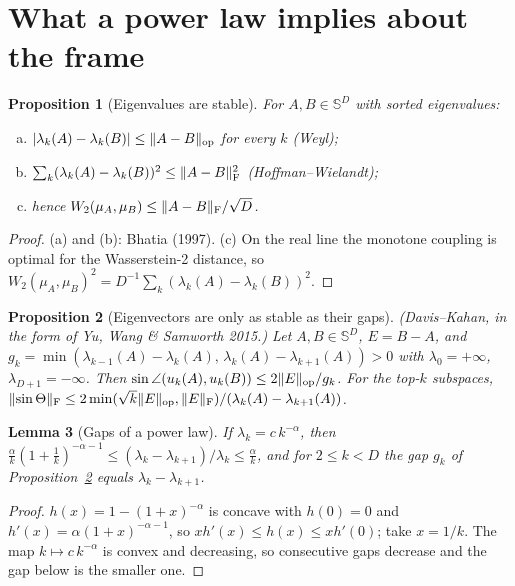 \documentclass[11pt,a4paper]{article}
\newcommand{\Sym}{\mathbb{S}}
\DeclarePairedDelimiter{\norm}{\lVert}{\rVert}
\DeclarePairedDelimiter{\abs}{\lvert}{\rvert}
\newcommand{\op}{\mathrm{op}}
\newcommand{\F}{\mathrm{F}}
\theoremstyle{plain}
\newtheorem{proposition}{Proposition}[section]
\newtheorem{lemma}[proposition]{Lemma}
\theoremstyle{definition}
\theoremstyle{remark}
\begin{document}
\section{What a power law implies about the frame}\label{sec:resolution}

\begin{proposition}[Eigenvalues are stable]\label{prop:weyl}
For $A,B\in\Sym^D$ with sorted eigenvalues:
\begin{enumerate}[(a)]
\item $\abs{\lambda_k(A)-\lambda_k(B)}\le\norm{A-B}_\op$ for every $k$ (Weyl);
\item $\sum_k(\lambda_k(A)-\lambda_k(B))^2\le\norm{A-B}_\F^2$ (Hoffman--Wielandt);
\item hence $W_2(\mu_A,\mu_B)\le\norm{A-B}_\F/\sqrt D$.
\end{enumerate}
\end{proposition}
\begin{proof}
(a) and (b): Bhatia (1997). (c) On the real line the monotone coupling is optimal for the Wasserstein-2 distance, so
$W_2(\mu_A,\mu_B)^2=D^{-1}\sum_k(\lambda_k(A)-\lambda_k(B))^2$.
\end{proof}

\begin{proposition}[Eigenvectors are only as stable as their gaps]\label{prop:dk}
(Davis--Kahan, in the form of Yu, Wang \& Samworth 2015.) Let $A,B\in\Sym^D$, $E=B-A$, and
$g_k=\min(\lambda_{k-1}(A)-\lambda_k(A),\,\lambda_k(A)-\lambda_{k+1}(A))>0$ with $\lambda_0=+\infty$,
$\lambda_{D+1}=-\infty$. Then $\sin\angle(u_k(A),u_k(B))\le2\norm{E}_\op/g_k$. For the top-$k$ subspaces,
$\norm{\sin\Theta}_\F\le2\min(\sqrt k\norm{E}_\op,\norm{E}_\F)/(\lambda_k(A)-\lambda_{k+1}(A))$.
\end{proposition}

\begin{lemma}[Gaps of a power law]\label{lem:gaps}
If $\lambda_k=c\,k^{-\alpha}$, then $\frac{\alpha}{k}(1+\frac1k)^{-\alpha-1}\le(\lambda_k-\lambda_{k+1})/\lambda_k\le\frac{\alpha}{k}$,
and for $2\le k<D$ the gap $g_k$ of Proposition~\ref{prop:dk} equals $\lambda_k-\lambda_{k+1}$.
\end{lemma}
\begin{proof}
$h(x)=1-(1+x)^{-\alpha}$ is concave with $h(0)=0$ and $h'(x)=\alpha(1+x)^{-\alpha-1}$, so $xh'(x)\le h(x)\le xh'(0)$;
take $x=1/k$. The map $k\mapsto c\,k^{-\alpha}$ is convex and decreasing, so consecutive gaps decrease and the gap
below is the smaller one.
\end{proof}
\end{document}
